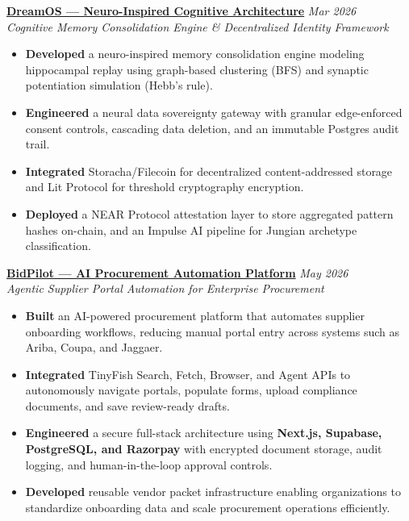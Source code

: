 \documentclass[a4paper,10pt]{article}
\begin{document}
\vspace{4pt}

\textbf{\href{https://github.com/let-the-dreamers-rise/dreamscape-atlas}{DreamOS --- Neuro-Inspired Cognitive Architecture}} \hfill \textit{Mar 2026} \\
\textit{Cognitive Memory Consolidation Engine \& Decentralized Identity Framework}
\begin{itemize}
    \item \textbf{Developed} a neuro-inspired memory consolidation engine modeling hippocampal replay using graph-based clustering (BFS) and synaptic potentiation simulation (Hebb's rule).
    \item \textbf{Engineered} a neural data sovereignty gateway with granular edge-enforced consent controls, cascading data deletion, and an immutable Postgres audit trail.
    \item \textbf{Integrated} Storacha/Filecoin for decentralized content-addressed storage and Lit Protocol for threshold cryptography encryption.
    \item \textbf{Deployed} a NEAR Protocol attestation layer to store aggregated pattern hashes on-chain, and an Impulse AI pipeline for Jungian archetype classification.
\end{itemize}

\vspace{4pt}

\textbf{\href{https://github.com/let-the-dreamers-rise/tinyfish-bidpilot}{BidPilot --- AI Procurement Automation Platform}} \hfill \textit{May 2026} \\
\textit{Agentic Supplier Portal Automation for Enterprise Procurement}
\begin{itemize}
    \item \textbf{Built} an AI-powered procurement platform that automates supplier onboarding workflows, reducing manual portal entry across systems such as Ariba, Coupa, and Jaggaer.
    \item \textbf{Integrated} TinyFish Search, Fetch, Browser, and Agent APIs to autonomously navigate portals, populate forms, upload compliance documents, and save review-ready drafts.
    \item \textbf{Engineered} a secure full-stack architecture using \textbf{Next.js, Supabase, PostgreSQL, and Razorpay} with encrypted document storage, audit logging, and human-in-the-loop approval controls.
    \item \textbf{Developed} reusable vendor packet infrastructure enabling organizations to standardize onboarding data and scale procurement operations efficiently.
\end{itemize}
\end{document}
